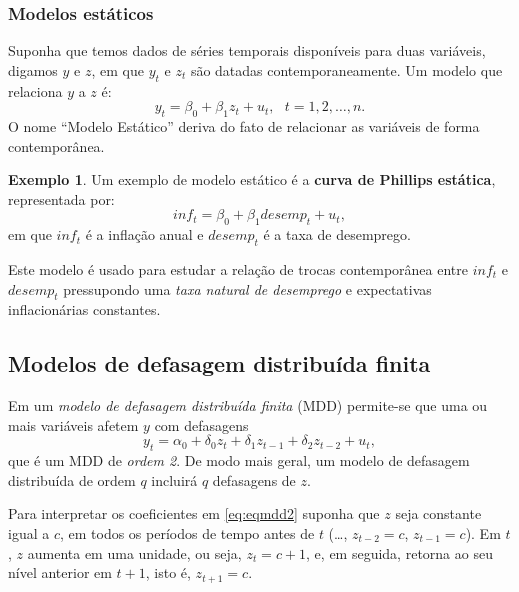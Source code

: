 \documentclass[
]{book}
\theoremstyle{definition}
\theoremstyle{definition}
\newtheorem{example}{Exemplo}[chapter]
\theoremstyle{definition}
\theoremstyle{remark}
\begin{document}
\hypertarget{modelos-estuxe1ticos}{%
\subsubsection{Modelos estáticos}\label{modelos-estuxe1ticos}}

Suponha que temos dados de séries temporais disponíveis para duas variáveis, digamos \(y\) e \(z\), em que \(y_t\) e \(z_t\) são datadas contemporaneamente. Um modelo que relaciona \(y\) a \(z\) é:
\begin{equation}
y_t = \beta_0 + \beta_1 z_t + u_t,  \,\,\,\,t=1,2,\ldots,n.
\label{eq:modelstatic}
\end{equation}
O nome ``Modelo Estático'' deriva do fato de relacionar as variáveis de forma contemporânea.

\begin{example}
\protect\hypertarget{exm:exampcurvphilips}{}{\label{exm:exampcurvphilips} }Um exemplo de modelo estático é a \textbf{curva de Phillips estática}, representada por:
\begin{equation}
inf_t = \beta_0 + \beta_1 desemp_t + u_t,
\label{eq:philcurve}
\end{equation}
em que \(inf_t\) é a inflação anual e \(desemp_t\) é a taxa de desemprego.
\end{example}

Este modelo é usado para estudar a relação de trocas contemporânea entre \(inf_t\) e \(desemp_t\) pressupondo uma \emph{taxa natural de desemprego} e expectativas inflacionárias constantes.

\hypertarget{modelos-de-defasagem-distribuuxedda-finita}{%
\subsection{Modelos de defasagem distribuída finita}\label{modelos-de-defasagem-distribuuxedda-finita}}

Em um \emph{modelo de defasagem distribuída finita} (MDD) permite-se que uma ou mais variáveis
afetem \(y\) com defasagens
\begin{equation}
y_t = \alpha_0 + \delta_0 z_t+\delta_1 z_{t-1} + \delta_2 z_{t-2} + u_t,
\label{eq:eqmdd2}
\end{equation}
que é um MDD de \emph{ordem 2}. De modo mais geral, um modelo de defasagem distribuída de ordem \(q\) incluirá \(q\) defasagens de \(z\).

Para interpretar os coeficientes em \eqref{eq:eqmdd2} suponha que \(z\) seja constante igual a \(c\),
em todos os períodos de tempo antes de \(t\) (\ldots, \(z_{t-2}=c\), \(z_{t-1}=c\)). Em \(t\), \(z\) aumenta em uma unidade, ou seja, \(z_t=c+1\), e, em seguida, retorna ao seu nível anterior em \(t+1\), isto é, \(z_{t+1}=c\).
\end{document}
